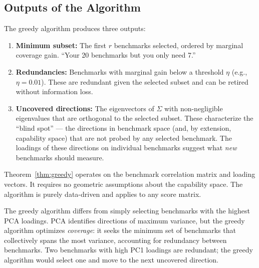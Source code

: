 \subsection{Outputs of the Algorithm}

The greedy algorithm produces three outputs:

\begin{enumerate}
  \item \textbf{Minimum subset:} The first $r$ benchmarks selected, ordered by marginal coverage gain. ``Your 20 benchmarks but you only need 7.''
  
  \item \textbf{Redundancies:} Benchmarks with marginal gain below a threshold $\eta$ (e.g., $\eta = 0.01$). These are redundant given the selected subset and can be retired without information loss.
  
  \item \textbf{Uncovered directions:} The eigenvectors of $\Sigma$ with non-negligible eigenvalues that are orthogonal to the selected subset. These characterize the ``blind spot'' --- the directions in benchmark space (and, by extension, capability space) that are not probed by any selected benchmark. The loadings of these directions on individual benchmarks suggest what \emph{new} benchmarks should measure.
\end{enumerate}

\begin{remark}
Theorem~\ref{thm:greedy} operates on the benchmark correlation matrix and loading vectors. It requires no geometric assumptions about the capability space. The algorithm is purely data-driven and applies to any score matrix.
\end{remark}

\begin{remark}
The greedy algorithm differs from simply selecting benchmarks with the highest PCA loadings. PCA identifies directions of maximum variance, but the greedy algorithm optimizes \emph{coverage}: it seeks the minimum set of benchmarks that collectively spans the most variance, accounting for redundancy between benchmarks. Two benchmarks with high PC1 loadings are redundant; the greedy algorithm would select one and move to the next uncovered direction.
\end{remark}
